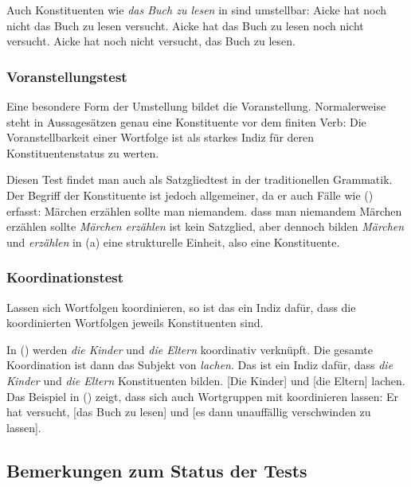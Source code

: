 \noindent
Auch Konstituenten wie \emph{das Buch zu lesen} in 
sind umstellbar:
\eal
\ex Aicke hat noch nicht das Buch zu lesen versucht.
\ex Aicke hat das Buch zu lesen noch nicht versucht.
\ex Aicke hat noch nicht versucht, das Buch zu lesen.
\zl
{}

\subsubsection{Voranstellungstest}

Eine besondere Form der Umstellung bildet die Voranstellung. Normalerweise steht
in Aussagesätzen genau eine Konstituente vor dem finiten Verb:
\eal
\label{bsp-v2}
\zl
Die Voranstellbarkeit einer Wortfolge ist als starkes Indiz für deren Konstituentenstatus
zu werten.

Diesen Test findet man auch als Satzgliedtest in der traditionellen Grammatik. Der
Begriff der Konstituente ist jedoch allgemeiner, da er auch Fälle wie () erfasst:
\eal
\ex Märchen erzählen sollte man niemandem.
\ex dass man niemandem Märchen erzählen sollte
\zl
\emph{Märchen erzählen} ist kein Satzglied, aber dennoch bilden \emph{Märchen} und
\emph{erzählen} in (a) eine strukturelle Einheit, also eine Konstituente.
  

\subsubsection{Koordinationstest}

Lassen sich Wortfolgen koordinieren, so ist das ein Indiz dafür, dass die koordinierten Wortfolgen
jeweils Konstituenten sind.

In () werden \emph{die Kinder} und \emph{die Eltern} koordinativ verknüpft.
Die gesamte Koordination ist dann das Subjekt von \emph{lachen}.
Das ist ein Indiz dafür, dass \emph{die Kinder}
und \emph{die Eltern} Konstituenten bilden.
\ea
{}[Die Kinder] und [die Eltern] lachen.
\z
Das Beispiel in () zeigt, dass sich auch Wortgruppen mit \zui koordinieren lassen:
\ea
Er hat versucht, [das Buch zu lesen] und [es dann unauffällig verschwinden zu lassen].
\z

\subsection{Bemerkungen zum Status der Tests}
\label{sec-status-der-ktests}

